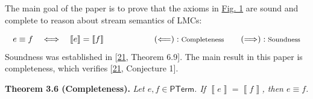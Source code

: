 \documentclass[11pt,a4paper]{amsart}
\begin{document}
\hypertarget{html:S3.SS0.SSS0.Px2.p2}{} The main goal of the paper is to prove that the axioms in \hyperlink{html:S3.F1}{Fig. 1} are sound and complete to reason about stream semantics of LMCs:
\par\medskip
\hypertarget{html:S3.Ex11}{}   %
\hypertarget{html:S3.Ex11.m1}{}\[e\equiv f\quad\Longleftrightarrow\quad\llbracket e\rrbracket=\llbracket f\rrbracket\qquad\qquad\qquad(\Longleftarrow):{\text{\footnotesize Completeness}}\qquad(\Longrightarrow):{\text{\footnotesize Soundness}}\]    Soundness was established in [\hyperlink{html:bib.bib21}{21}, Theorem 6.9]. The main result in this paper is completeness, which verifies [\hyperlink{html:bib.bib21}{21}, Conjecture 1].
\par\medskip

\hypertarget{html:S3.Thmtheorem6}{} \par\noindent\textbf{\textbf{Theorem 3.6}\textbf{ }(Completeness)\textbf{.}}\quad  %
\hypertarget{html:S3.Thmtheorem6.p1}{} \emph{Let %
\hypertarget{html:S3.Thmtheorem6.p1.m1}{}\({e,f\in\mathsf{PTerm}}\). If %
\hypertarget{html:S3.Thmtheorem6.p1.m2}{}\({\left\llbracket{e}\right\rrbracket=\left\llbracket{f}\right\rrbracket}\), then %
\hypertarget{html:S3.Thmtheorem6.p1.m3}{}\({e\equiv f}\).}
\par\medskip
    
%
\end{document}
